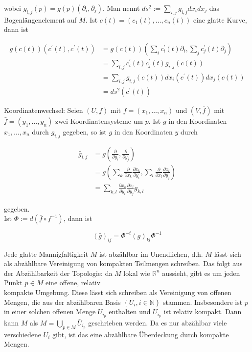 \documentclass[10pt, letterpaper]{article}
\begin{document}
wobei $g_{i, j}(p)=g(p)\left(\partial_{i}, \partial_{j}\right)$. Man nennt $d s^{2}:=\sum_{i, j} g_{i, j} d x_{i} d x_{j}$ das Bogenlängenelement auf $M$. Ist $c(t)=\left(c_{1}(t), \ldots, c_{n}(t)\right)$ eine glatte Kurve, dann ist

$$
\begin{aligned}
g(c(t))\left(c^{\prime}(t), c^{\prime}(t)\right) & =g(c(t))\left(\sum_{i} c_{i}^{\prime}(t) \partial_{i}, \sum_{j} c_{j}^{\prime}(t) \partial_{j}\right) \\
& =\sum_{i, j} c_{i}^{\prime}(t) c_{j}^{\prime}(t) g_{i, j}(c(t)) \\
& =\sum_{i, j} g_{i, j}(c(t)) d x_{i}\left(c^{\prime}(t)\right) d x_{j}(c(t)) \\
& =d s^{2}\left(c^{\prime}(t)\right)
\end{aligned}
$$

Koordinatenwechsel: Seien $(U, f)$ mit $f=\left(x_{1}, \ldots, x_{n}\right)$ und $(V, \bar{f})$ mit $\bar{f}=\left(y_{1}, \ldots, y_{n}\right)$ zwei Koordinatensysteme um $p$. Ist $g$ in den Koordinaten $x_{1}, \ldots, x_{n}$ durch $g_{i, j}$ gegeben, so ist $g$ in den Koordinaten $y$ durch

$$
\begin{aligned}
\bar{g}_{i, j} & =g\left(\frac{\partial}{\partial y_{i}}, \frac{\partial}{\partial y_{j}}\right) \\
& =g\left(\sum_{k} \frac{\partial}{\partial x_{k}} \frac{\partial x_{k}}{\partial y_{i}}, \sum_{l} \frac{\partial}{\partial x_{l}} \frac{\partial x_{l}}{\partial y_{j}}\right) \\
& =\sum_{k, l} \frac{\partial x_{k}}{\partial y_{i}} \frac{\partial x_{l}}{\partial y_{j}} g_{k, l}
\end{aligned}
$$

gegeben.\\
Ist $\Phi:=d\left(\bar{f} \circ f^{-1}\right)$, dann ist

$$
(\bar{g})_{i j}=\Phi^{-t}(g)_{k l} \Phi^{-1}
$$

Jede glatte Mannigfaltigkeit $M$ ist abzählbar im Unendlichen, d.h. $M$ lässt sich als abzählbare Vereinigung von kompakten Teilmengen schreiben. Das folgt aus der Abzählbarkeit der Topologie: da $M$ lokal wie $\mathbb{R}^{n}$ aussieht, gibt es um jeden Punkt $p \in M$ eine offene, relativ\\
kompakte Umgebung. Diese lässt sich schreiben als Vereinigung von offenen Mengen, die aus der abzählbaren Basis $\left\{U_{i}, i \in \mathbb{N}\right\}$ stammen. Insbesondere ist $p$ in einer solchen offenen Menge $U_{i_{p}}$ enthalten und $U_{i_{p}}$ ist relativ kompakt. Dann kann $M$ als $M=\bigcup_{p \in M} \bar{U}_{i_{p}}$ geschrieben werden. Da es nur abzählbar viele verschiedene $U_{i}$ gibt, ist das eine abzählbare Überdeckung durch kompakte Mengen.
\end{document}
